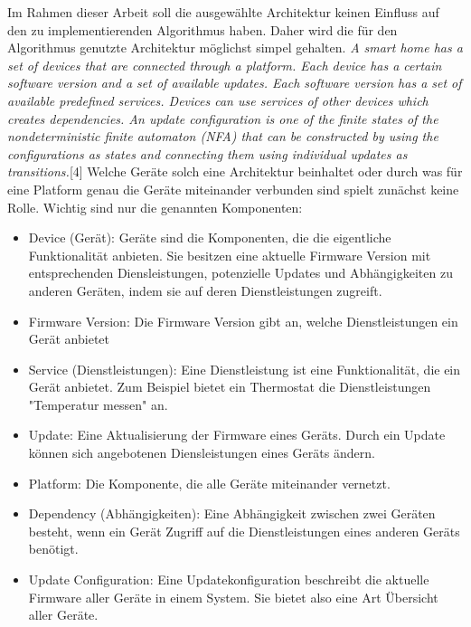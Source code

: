 Im Rahmen dieser Arbeit soll die ausgewählte Architektur keinen Einfluss auf den zu implementierenden Algorithmus haben.
Daher wird die für den Algorithmus genutzte Architektur möglichst simpel gehalten. 
\linebreak
\textit{A smart home has a set of devices that are connected through
a platform. Each device has a certain software version and
a set of available updates. Each software version has a set
of available predefined services. Devices can use services of
other devices which creates dependencies. An update configuration
is one of the finite states of the nondeterministic
finite automaton (NFA) that can be constructed by using the
configurations as states and connecting them using individual
updates as transitions.}[4]
Welche Geräte solch eine Architektur beinhaltet oder durch was für eine Platform genau die Geräte miteinander verbunden sind
spielt zunächst keine Rolle. Wichtig sind nur die genannten Komponenten:
\begin{itemize}
\item Device (Gerät): Geräte sind die Komponenten, die die eigentliche Funktionalität anbieten. Sie besitzen eine aktuelle Firmware
Version mit entsprechenden Diensleistungen, potenzielle Updates und Abhängigkeiten zu anderen Geräten, indem sie auf deren
Dienstleistungen zugreift.
\item Firmware Version: Die Firmware Version gibt an, welche Dienstleistungen ein Gerät anbietet 
\item Service (Dienstleistungen): Eine Dienstleistung ist eine Funktionalität, die ein Gerät anbietet. Zum Beispiel bietet ein Thermostat
die Dienstleistungen "Temperatur messen" an.
\item Update: Eine Aktualisierung der Firmware eines Geräts. Durch ein Update können sich angebotenen Diensleistungen eines Geräts ändern.
\item Platform: Die Komponente, die alle Geräte miteinander vernetzt.
\item Dependency (Abhängigkeiten): Eine Abhängigkeit zwischen zwei Geräten besteht, wenn ein Gerät Zugriff auf die Dienstleistungen eines
anderen Geräts benötigt.
\item Update Configuration: Eine Updatekonfiguration beschreibt die aktuelle Firmware aller Geräte in einem System. Sie bietet also eine Art 
Übersicht aller Geräte. 
\end{itemize}


